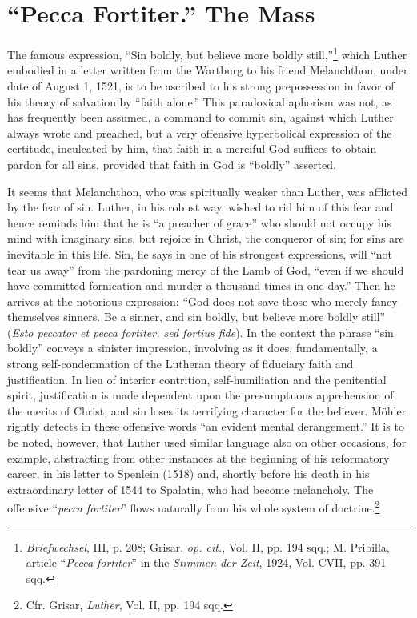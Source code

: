 \section{“Pecca Fortiter.” The Mass}

The famous expression, “Sin boldly, but believe more boldly
still,”\footnote
{\textit{Briefwechsel}, III, p. 208; Grisar, \textit{op. cit.}, Vol. II, pp. 194 sqq.; M. Pribilla, article
``\textit{Pecca fortiter}'' in the \textit{Stimmen der Zeit}, 1924, Vol. CVII, pp. 391 sqq.}
which Luther embodied in a letter written from the Wartburg to his friend
Melanchthon, under date of August 1, 1521, is to
be ascribed to his strong prepossession in favor of his theory of salvation
by “faith alone.” This paradoxical aphorism was not, as has
frequently been assumed, a command to commit sin, against which
Luther always wrote and preached, but a very offensive hyperbolical
expression of the certitude, inculcated by him, that faith in a merciful
God suffices to obtain pardon for all sins, provided that faith in
God is “boldly” asserted.

It seems that Melanchthon, who was spiritually weaker than Luther, was
afflicted by the fear of sin. Luther, in his robust way, wished
to rid him of this fear and hence reminds him that he is “a preacher
of grace” who should not occupy his mind with imaginary sins, but
rejoice in Christ, the conqueror of sin; for sins are inevitable in this
life. Sin, he says in one of his strongest expressions, will “not tear us
away” from the pardoning mercy of the Lamb of God, “even if we
should have committed fornication and murder a thousand times in
one day.” Then he arrives at the notorious expression: “God does not
save those who merely fancy themselves sinners. Be a sinner, and sin
boldly, but believe more boldly still” (\textit{Esto peccator et pecca fortiter,
sed fortius fide}). In the context the phrase “sin boldly” conveys
a sinister impression, involving as it does, fundamentally, a strong self-condemnation
of the Lutheran theory of fiduciary faith and justification. In lieu of
interior contrition, self-humiliation and the penitential spirit, justification
is made dependent upon the presumptuous
apprehension of the merits of Christ, and sin loses its terrifying
character for the believer. Möhler rightly detects in these offensive
words “an evident mental derangement.” It is to be noted, however,
that Luther used similar language also on other occasions, for example,
abstracting from other instances at the beginning of his reformatory
career, in his letter to Spenlein (1518) and, shortly before his death in
his extraordinary letter of 1544 to Spalatin, who had become melancholy.
The offensive “\textit{pecca fortiter}” flows naturally from his whole
system of doctrine.\footnote{Cfr. Grisar, \textit{Luther}, Vol. II, pp. 194 sqq.}

